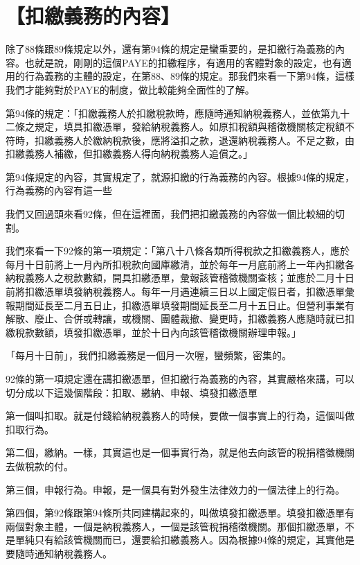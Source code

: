 \documentclass[]{ctexbook}
\begin{document}
\hypertarget{ux6263ux7e73ux7fa9ux52d9ux7684ux5167ux5bb9}{%
\section{【扣繳義務的內容】}\label{ux6263ux7e73ux7fa9ux52d9ux7684ux5167ux5bb9}}

除了88條跟89條規定以外，還有第94條的規定是蠻重要的，是扣繳行為義務的內容。也就是說，剛剛的這個PAYE的扣繳程序，有適用的客體對象的設定，也有適用的行為義務的主體的設定，在第88、89條的規定。那我們來看一下第94條，這樣我們才能夠對於PAYE的制度，做比較能夠全面性的了解。

第94條的規定：「扣繳義務人於扣繳稅款時，應隨時通知納稅義務人，並依第九十二條之規定，填具扣繳憑單，發給納稅義務人。如原扣稅額與稽徵機關核定稅額不符時，扣繳義務人於繳納稅款後，應將溢扣之款，退還納稅義務人。不足之數，由扣繳義務人補繳，但扣繳義務人得向納稅義務人追償之。」

第94條規定的內容，其實規定了，就源扣繳的行為義務的內容。根據94條的規定，行為義務的內容有這一些

我們又回過頭來看92條，但在這裡面，我們把扣繳義務的內容做一個比較細的切割。

我們來看一下92條的第一項規定：「第八十八條各類所得稅款之扣繳義務人，應於每月十日前將上一月內所扣稅款向國庫繳清，並於每年一月底前將上一年內扣繳各納稅義務人之稅款數額，開具扣繳憑單，彙報該管稽徵機關查核；並應於二月十日前將扣繳憑單填發納稅義務人。每年一月遇連續三日以上國定假日者，扣繳憑單彙報期間延長至二月五日止，扣繳憑單填發期間延長至二月十五日止。但營利事業有解散、廢止、合併或轉讓，或機關、團體裁撤、變更時，扣繳義務人應隨時就已扣繳稅款數額，填發扣繳憑單，並於十日內向該管稽徵機關辦理申報。」

「每月十日前」，我們扣繳義務是一個月一次喔，蠻頻繁，密集的。

92條的第一項規定還在講扣繳憑單，但扣繳行為義務的內容，其實嚴格來講，可以切分成以下這幾個階段：扣取、繳納、申報、填發扣繳憑單

第一個叫扣取。就是付錢給納稅義務人的時候，要做一個事實上的行為，這個叫做扣取行為。

第二個，繳納。一樣，其實這也是一個事實行為，就是他去向該管的稅捐稽徵機關去做稅款的付。

第三個，申報行為。申報，是一個具有對外發生法律效力的一個法律上的行為。

第四個，第92條跟第94條所共同建構起來的，叫做填發扣繳憑單。填發扣繳憑單有兩個對象主體，一個是納稅義務人，一個是該管稅捐稽徵機關。那個扣繳憑單，不是單純只有給該管機關而已，還要給扣繳義務人。因為根據94條的規定，其實他是要隨時通知納稅義務人。
\end{document}
